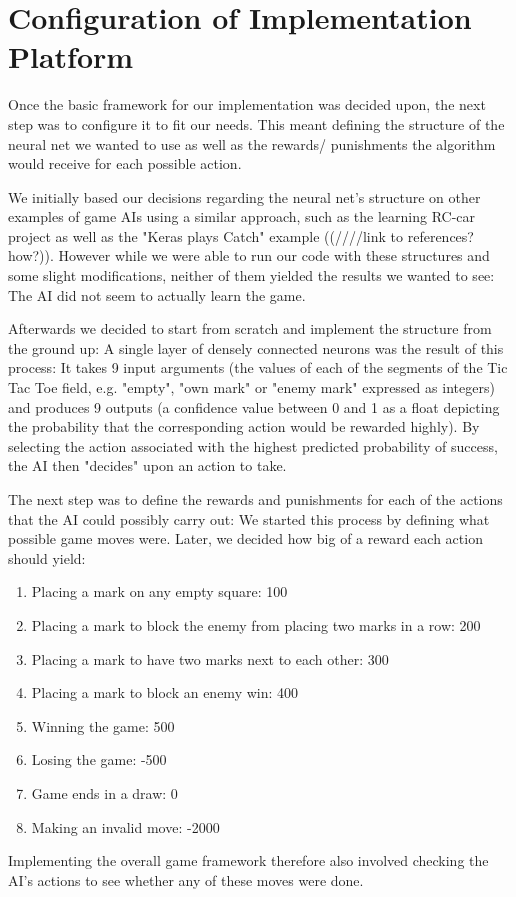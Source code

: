 \section{Configuration of Implementation Platform}

Once the basic framework for our implementation was decided upon, the next step was to configure it to fit our needs. This meant defining the structure of the neural net we wanted to use as well as the rewards/ punishments the algorithm would receive for each possible action.

We initially based our decisions regarding the neural net's structure on other examples of game AIs using a similar approach, such as the learning RC-car project as well as the "Keras plays Catch" example ((////link to references? how?)). However while we were able to run our code with these structures and some slight modifications, neither of them yielded the results we wanted to see: The AI did not seem to actually learn the game.

Afterwards we decided to start from scratch and implement the structure from the ground up: A single layer of densely connected neurons was the result of this process: It takes 9 input arguments (the values of each of the segments of the Tic Tac Toe field, e.g. "empty", "own mark" or "enemy mark" expressed as integers) and produces 9 outputs (a confidence value between 0 and 1 as a float depicting the probability that the corresponding action would be rewarded highly). By selecting the action associated with the highest predicted probability of success, the AI then "decides" upon an action to take.

The next step was to define the rewards and punishments for each of the actions that the AI could possibly carry out: We started this process by defining what possible game moves were. Later, we decided how big of a reward each action should yield:

\begin{enumerate}
	\item Placing a mark on any empty square: 100
	\item Placing a mark to block the enemy from placing two marks in a row: 200
	\item Placing a mark to have two marks next to each other: 300
	\item Placing a mark to block an enemy win: 400
	\item Winning the game: 500
	\item Losing the game: -500
	\item Game ends in a draw: 0
	\item Making an invalid move: -2000
\end{enumerate}

Implementing the overall game framework therefore also involved checking the AI's actions to see whether any of these moves were done.